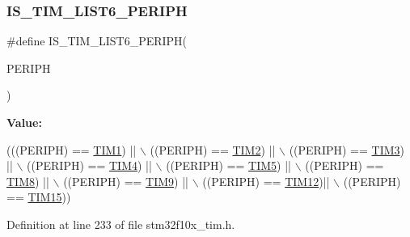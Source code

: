 \subsubsection{\texorpdfstring{I\+S\+\_\+\+T\+I\+M\+\_\+\+L\+I\+S\+T6\+\_\+\+P\+E\+R\+I\+PH}{IS\_TIM\_LIST6\_PERIPH}}
{\footnotesize\ttfamily \#define I\+S\+\_\+\+T\+I\+M\+\_\+\+L\+I\+S\+T6\+\_\+\+P\+E\+R\+I\+PH(\begin{DoxyParamCaption}\item[{}]{P\+E\+R\+I\+PH }\end{DoxyParamCaption})}

{\bfseries Value\+:}
\begin{DoxyCode}
(((PERIPH) == \hyperlink{group___peripheral__declaration_ga2e87451fea8dc9380056d3cfc5ed81fb}{TIM1}) || \(\backslash\)
                                      ((PERIPH) == \hyperlink{group___peripheral__declaration_ga3cfac9f2e43673f790f8668d48b4b92b}{TIM2}) || \(\backslash\)
                                      ((PERIPH) == \hyperlink{group___peripheral__declaration_ga61ee4c391385607d7af432b63905fcc9}{TIM3}) || \(\backslash\)
                                      ((PERIPH) == \hyperlink{group___peripheral__declaration_ga91a09bad8bdc7a1cb3d85cf49c94c8ec}{TIM4}) || \(\backslash\)
                                      ((PERIPH) == \hyperlink{group___peripheral__declaration_ga5125ff6a23a2ed66e2e19bd196128c14}{TIM5}) || \(\backslash\)
                                      ((PERIPH) == \hyperlink{group___peripheral__declaration_ga9a3660400b17735e91331f256095810e}{TIM8}) || \(\backslash\)
                                      ((PERIPH) == \hyperlink{group___peripheral__declaration_gaf52b4b4c36110a0addfa98059f54a50e}{TIM9}) || \(\backslash\)
                                      ((PERIPH) == \hyperlink{group___peripheral__declaration_ga2397f8a0f8e7aa10cf8e8c049e431e53}{TIM12})|| \(\backslash\)
                                      ((PERIPH) == \hyperlink{group___peripheral__declaration_ga87e4b442041d1c03a6af113fbe04a182}{TIM15}))
\end{DoxyCode}


Definition at line 233 of file stm32f10x\+\_\+tim.\+h.

\mbox{\label{group___t_i_m___exported__constants_ga421bba71d6e8fbe9a9d422ecd59e79be}} 
